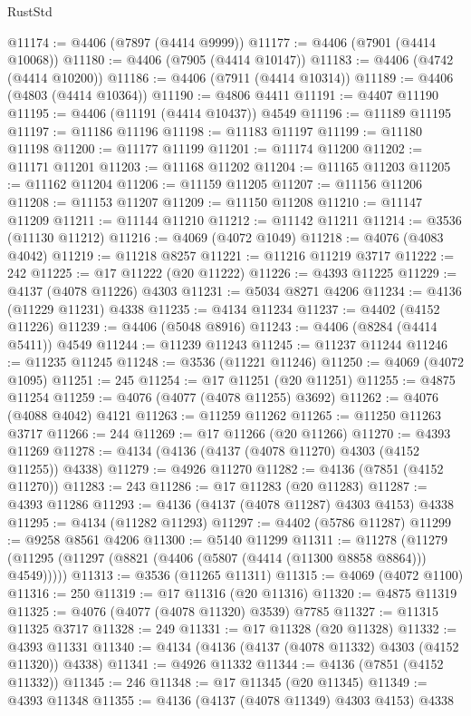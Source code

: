 \begin{lexlean}{RustStd}
\begin{coremodule}
@11174 := @4406 (@7897 (@4414 @9999))
@11177 := @4406 (@7901 (@4414 @10068))
@11180 := @4406 (@7905 (@4414 @10147))
@11183 := @4406 (@4742 (@4414 @10200))
@11186 := @4406 (@7911 (@4414 @10314))
@11189 := @4406 (@4803 (@4414 @10364))
@11190 := @4806 @4411
@11191 := @4407 @11190
@11195 := @4406 (@11191 (@4414 @10437)) @4549
@11196 := @11189 @11195
@11197 := @11186 @11196
@11198 := @11183 @11197
@11199 := @11180 @11198
@11200 := @11177 @11199
@11201 := @11174 @11200
@11202 := @11171 @11201
@11203 := @11168 @11202
@11204 := @11165 @11203
@11205 := @11162 @11204
@11206 := @11159 @11205
@11207 := @11156 @11206
@11208 := @11153 @11207
@11209 := @11150 @11208
@11210 := @11147 @11209
@11211 := @11144 @11210
@11212 := @11142 @11211
@11214 := @3536 (@11130 @11212)
@11216 := @4069 (@4072 @1049)
@11218 := @4076 (@4083 @4042)
@11219 := @11218 @8257
@11221 := @11216 @11219 @3717
@11222 := 242
@11225 := @17 @11222 (@20 @11222)
@11226 := @4393 @11225
@11229 := @4137 (@4078 @11226) @4303
@11231 := @5034 @8271 @4206
@11234 := @4136 (@11229 @11231) @4338
@11235 := @4134 @11234
@11237 := @4402 (@4152 @11226)
@11239 := @4406 (@5048 @8916)
@11243 := @4406 (@8284 (@4414 @5411)) @4549
@11244 := @11239 @11243
@11245 := @11237 @11244
@11246 := @11235 @11245
@11248 := @3536 (@11221 @11246)
@11250 := @4069 (@4072 @1095)
@11251 := 245
@11254 := @17 @11251 (@20 @11251)
@11255 := @4875 @11254
@11259 := @4076 (@4077 (@4078 @11255) @3692)
@11262 := @4076 (@4088 @4042) @4121
@11263 := @11259 @11262
@11265 := @11250 @11263 @3717
@11266 := 244
@11269 := @17 @11266 (@20 @11266)
@11270 := @4393 @11269
@11278 := @4134 (@4136 (@4137 (@4078 @11270) @4303 (@4152 @11255)) @4338)
@11279 := @4926 @11270
@11282 := @4136 (@7851 (@4152 @11270))
@11283 := 243
@11286 := @17 @11283 (@20 @11283)
@11287 := @4393 @11286
@11293 := @4136 (@4137 (@4078 @11287) @4303 @4153) @4338
@11295 := @4134 (@11282 @11293)
@11297 := @4402 (@5786 @11287)
@11299 := @9258 @8561 @4206
@11300 := @5140 @11299
@11311 := @11278
    (@11279 (@11295 (@11297 (@8821 (@4406 (@5807 (@4414 (@11300 @8858 @8864))) @4549)))))
@11313 := @3536 (@11265 @11311)
@11315 := @4069 (@4072 @1100)
@11316 := 250
@11319 := @17 @11316 (@20 @11316)
@11320 := @4875 @11319
@11325 := @4076 (@4077 (@4078 @11320) @3539) @7785
@11327 := @11315 @11325 @3717
@11328 := 249
@11331 := @17 @11328 (@20 @11328)
@11332 := @4393 @11331
@11340 := @4134 (@4136 (@4137 (@4078 @11332) @4303 (@4152 @11320)) @4338)
@11341 := @4926 @11332
@11344 := @4136 (@7851 (@4152 @11332))
@11345 := 246
@11348 := @17 @11345 (@20 @11345)
@11349 := @4393 @11348
@11355 := @4136 (@4137 (@4078 @11349) @4303 @4153) @4338

\end{coremodule}
\end{lexlean}
